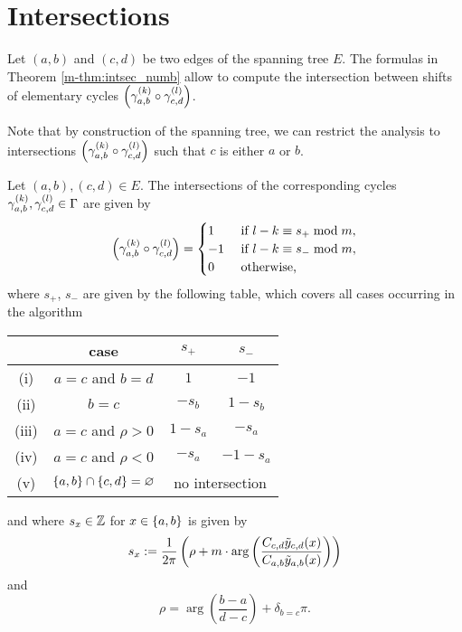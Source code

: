 \documentclass[main.tex]{subfiles}
\begin{document}
  \section{Intersections}\label{sec:intersections}

   Let $(a,b)$ and $(c,d)$ be two edges of the spanning tree $E$.
  The formulas in Theorem \ref{m-thm:intsec_numb} allow to compute the intersection
  between shifts of elementary cycles $\left(\gamma_{a,b}^{(k)} \circ \gamma_{c,d}^{(l)}\right)$.

  Note that by construction of the spanning tree,
  we can restrict the analysis to intersections $\left(\gamma_{a,b}^{(k)} \circ \gamma_{c,d}^{(l)}\right)$
  such that $c$ is either $a$ or $b$.

   \begin{thm}\label{thm:intsec_numb}
      Let $(a,b),(c,d) \in E$. The intersections of the corresponding cycles $\gamma_{a,b}^{(k)}, \gamma_{c,d}^{(l)} \in \Gamma$ are given by
      \begin{equation*}
          \left(\gamma_{a,b}^{(k)} \circ \gamma_{c,d}^{(l)}\right)
          = \begin{cases}
              1  &\text{ if } l-k \equiv s_+ \bmod m,\\
              -1 &\text{ if } l-k \equiv s_- \bmod m,\\
              0 &\text{ otherwise,}
          \end{cases}
      \end{equation*}
      where $s_+$, $s_-$ are given by the following table, which covers all
      cases occurring in the algorithm
      \begin{center}
          \normalfont
      \begin{tabular}{cccc}
          \toprule
          & case & $s_+$ & $s_-$ \\
          \midrule
         (i) & $a=c$ and $b=d$ & $1$ & $-1$ \\
         (ii) & $b=c$ & $-s_b$ & $1-s_b$ \\
         (iii) & $a=c$ and $\rho>0$ & $1-s_a$ & $-s_a$ \\
         (iv) & $a=c$ and $\rho<0$ & $-s_a$ & $-1-s_a$\\
         (v) & $\left\{a,b\right\}\cap\left\{c,d\right\}=\varnothing$ & \multicolumn{2}{c}{no intersection} \\
          \bottomrule
      \end{tabular}
      \end{center}
      and where $s_x \in \mathbb{Z}$ for $x\in\left\{a,b\right\}$ is given by
      \begin{equation*}\label{eq:s_x}
	    s_x := \frac{1}{2\pi}\left( \rho + m \cdot \arg \left( \frac{C_{c,d} \tilde{y}_{c,d}(x)}{C_{a,b}\tilde{y}_{a,b}(x)} \right)
	    \right)
      \end{equation*}
     and
      \begin{equation*}
          \rho = \arg \left( \frac{b-a}{d-c} \right) + \delta_{b=c}\pi.
      \end{equation*}
 \end{thm}
\end{document}
